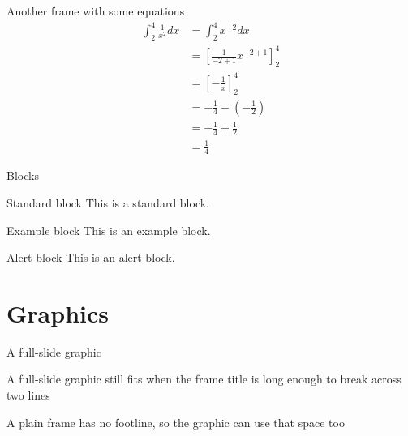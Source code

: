 \documentclass[aspectratio=169,xcolor={rgb}]{beamer}
\begin{document}
\begin{frame}{Another frame with some equations}
  \begin{equation*}
    \begin{split}
      \int_2^4\frac{1}{x^2}dx &= \int_2^4 x^{-2}dx\\
      &= \left[\frac{1}{-2+1}x^{-2 + 1}\right]_2^4\\
      &= \left[-\frac{1}{x}\right]_2^4\\
      &= -\tfrac{1}{4} - \left(-\tfrac{1}{2}\right)\\
      &= -\tfrac{1}{4} + \tfrac{1}{2}\\
      &= \tfrac{1}{4}
    \end{split}
  \end{equation*}
\end{frame}

\begin{frame}{Blocks}
  \begin{block}{Standard block}
    This is a standard block.
  \end{block}

  \begin{exampleblock}{Example block}
    This is an example block.
  \end{exampleblock}

  \begin{alertblock}{Alert block}
    This is an alert block.
  \end{alertblock}
\end{frame}

\section{Graphics}

\begin{frame}{A full-slide graphic}
\end{frame}

\begin{frame}{A full-slide graphic still fits when the frame title is long enough to break across two lines}
\end{frame}

\begin{frame}[plain]{A plain frame has no footline, so the graphic can use that space too}
\end{frame}
\end{document}
